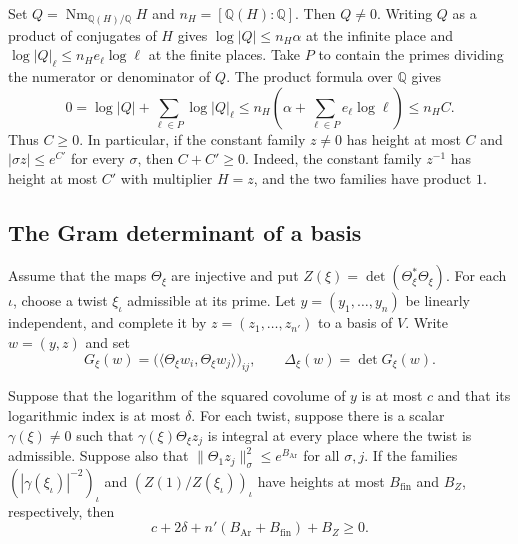 Set \(Q=\operatorname{Nm}_{\mathbb Q(H)/\mathbb Q}H\) and
\(n_H=[\mathbb Q(H):\mathbb Q]\). Then \(Q\ne0\). Writing \(Q\) as a product
of conjugates of \(H\) gives \(\log|Q|\le n_H\alpha\) at the infinite place
and \(\log|Q|_\ell\le n_H e_\ell\log\ell\) at the finite places. Take \(P\)
to contain the primes dividing the numerator or denominator of \(Q\).
The product formula over \(\mathbb Q\) gives
\[
 0=\log|Q|+\sum_{\ell\in P}\log|Q|_\ell
   \le n_H\left(\alpha+\sum_{\ell\in P} e_\ell\log\ell\right)
   \le n_H C .
\]
Thus \(C\ge0\). In particular, if the constant family \(z\ne0\) has height
at most \(C\) and \(|\sigma z|\le e^{C'}\) for every \(\sigma\), then
\(C+C'\ge0\). Indeed, the constant family \(z^{-1}\) has height at most
\(C'\) with multiplier \(H=z\), and the two families have product \(1\).

\subsection{The Gram determinant of a basis}

Assume that the maps \(\Theta_\xi\) are injective and put
\(Z(\xi)=\det(\Theta_\xi^*\Theta_\xi)\). For each \(\iota\), choose a
twist \(\xi_\iota\) admissible at its prime. Let \(y=(y_1,\ldots,y_n)\)
be linearly independent, and complete it by \(z=(z_1,\ldots,z_{n'})\)
to a basis of \(V\). Write \(w=(y,z)\) and set
\[
 G_\xi(w)=\bigl(\langle\Theta_\xi w_i,\Theta_\xi w_j\rangle\bigr)_{ij},
 \qquad \Delta_\xi(w)=\det G_\xi(w).
\]

\begin{proposition}\label{prop:gram-product}
Suppose that the logarithm of the squared covolume of \(y\) is at most
\(c\) and that its logarithmic index is at most \(\delta\). For each twist,
suppose there is a scalar \(\gamma(\xi)\ne0\) such that
\(\gamma(\xi)\Theta_\xi z_j\) is integral at every place where the twist is
admissible. Suppose also that \(\|\Theta_1 z_j\|_\sigma^2\le e^{B_{\mathrm{Ar}}}\)
for all \(\sigma,j\). If the families \((|\gamma(\xi_\iota)|^{-2})_\iota\)
and \((Z(1)/Z(\xi_\iota))_\iota\) have heights at most
\(B_{\mathrm{fin}}\) and \(B_Z\), respectively, then
\begin{equation}\label{eq:gram-product}
  c+2\delta+n'(B_{\mathrm{Ar}}+B_{\mathrm{fin}})+B_Z\ge0.
\end{equation}
\end{proposition}

